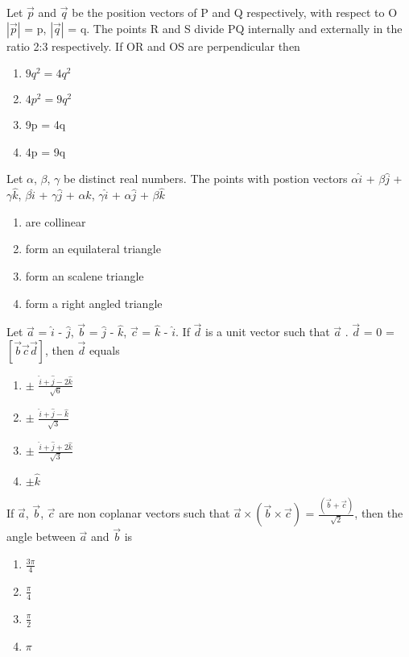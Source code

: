 \item Let $\overrightarrow{p}$ and $\overrightarrow{q}$ be the position vectors of P and Q respectively, with respect to O $|\overrightarrow{p}|$ = p, $|\overrightarrow{q}|$ = q. The points R and S divide PQ internally and externally in the ratio 2:3 respectively. If OR and OS are perpendicular then
\begin{enumerate}
\item $9q^{2} = 4q^{2}$
\item $4p^{2} = 9q^{2}$
\item 9p = 4q
\item 4p = 9q
\end{enumerate}

\item Let $\alpha$, $\beta$, $\gamma$ be distinct real numbers. The points with postion vectors 
$\alpha \hat{i}$ + $\beta \hat{j}$ + $\gamma \hat{k}$, $\beta \hat{i}$ + $\gamma \hat{j}$ + $\alpha \hat{k}$, $\gamma \hat{i}$ + $\alpha \hat{j}$ + $\beta \hat{k}$
\begin{enumerate}
\item are collinear
\item form an equilateral triangle
\item form an scalene triangle
\item form a right angled triangle
\end{enumerate}

\item Let $\overrightarrow{a}$ = $\hat{i}$ - $\hat{j}$, $\overrightarrow{b}$ = $\hat{j}$ - $\hat{k}$, 
$\overrightarrow{c}$ = $\hat{k}$ - $\hat{i}$. If $\overrightarrow{d}$ is a unit vector such that 
$\overrightarrow{a}$ . $\overrightarrow{d}$ = 0 = $[\overrightarrow{b} \overrightarrow{c} \overrightarrow{d}]$, then $\overrightarrow{d}$ equals
\begin{enumerate}
\item $\pm$ $\frac{\hat{i} + \hat{j} - 2\hat{k}}{\sqrt{6}}$
\item $\pm$ $\frac{\hat{i} + \hat{j} - \hat{k}}{\sqrt{3}}$
\item $\pm$ $\frac{\hat{i} + \hat{j} + 2\hat{k}}{\sqrt{3}}$
\item $\pm \hat{k}$
\end{enumerate}

\item If $\overrightarrow{a}$, $\overrightarrow{b}$, $\overrightarrow{c}$ are non coplanar vectors such that $\overrightarrow{a} \times (\overrightarrow{b} \times \overrightarrow{c})$ = $\frac{(\overrightarrow{b} + \overrightarrow{c})}{\sqrt{2}}$, then the angle between $\overrightarrow{a}$ and $\overrightarrow{b}$ is
\begin{enumerate}
\item $\frac{3\pi}{4}$
\item $\frac{\pi}{4}$
\item $\frac{\pi}{2}$
\item $\pi$
\end{enumerate}

